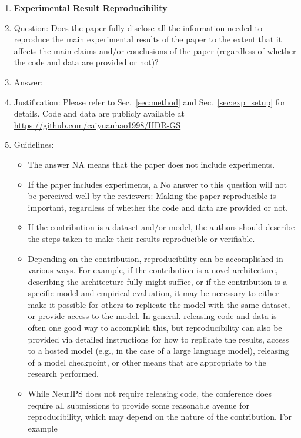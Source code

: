 \documentclass{article}
\begin{document}
\begin{enumerate}
    \item {\bf Experimental Result Reproducibility}
    \item[] Question: Does the paper fully disclose all the information needed to reproduce the main experimental results of the paper to the extent that it affects the main claims and/or conclusions of the paper (regardless of whether the code and data are provided or not)?
    \item[] Answer: \answerYes{} %
    \item[] Justification: Please refer to Sec.~\ref{sec:method} and Sec.~\ref{sec:exp_setup} for details. Code and data are publicly available at \url{https://github.com/caiyuanhao1998/HDR-GS}
    \item[] Guidelines:
    \begin{itemize}
        \item The answer NA means that the paper does not include experiments.
        \item If the paper includes experiments, a No answer to this question will not be perceived well by the reviewers: Making the paper reproducible is important, regardless of whether the code and data are provided or not.
        \item If the contribution is a dataset and/or model, the authors should describe the steps taken to make their results reproducible or verifiable. 
        \item Depending on the contribution, reproducibility can be accomplished in various ways. For example, if the contribution is a novel architecture, describing the architecture fully might suffice, or if the contribution is a specific model and empirical evaluation, it may be necessary to either make it possible for others to replicate the model with the same dataset, or provide access to the model. In general. releasing code and data is often one good way to accomplish this, but reproducibility can also be provided via detailed instructions for how to replicate the results, access to a hosted model (e.g., in the case of a large language model), releasing of a model checkpoint, or other means that are appropriate to the research performed.
        \item While NeurIPS does not require releasing code, the conference does require all submissions to provide some reasonable avenue for reproducibility, which may depend on the nature of the contribution. For example
        \begin{enumerate}

\end{enumerate}
\end{itemize}
\end{enumerate}
\end{document}
